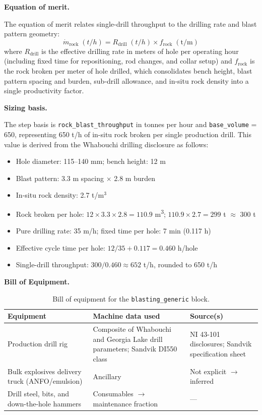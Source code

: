 \medskip
\noindent\textbf{Equation of merit.}\quad

The equation of merit relates single-drill throughput to the drilling rate and blast pattern geometry:
\[
	\dot{m}_{\text{rock}}\;(\si{t/h}) = R_{\text{drill}}\;(\si{t/h}) \times f_{\text{rock}}\;(\text{t/m})
\]
where $R_{\text{drill}}$ is the effective drilling rate in meters of hole per operating hour (including fixed time for repositioning, rod changes, and collar setup) and $f_{\text{rock}}$ is the rock broken per meter of hole drilled, which consolidates bench height, blast pattern spacing and burden, sub-drill allowance, and in-situ rock density into a single productivity factor.

\medskip
\noindent\textbf{Sizing basis.}\quad

The step basis is \texttt{rock\_blast\_throughput} in tonnes per hour and \texttt{base\_volume} = 650, representing 650 t/h of in-situ rock broken per single production drill. This value is derived from the Whabouchi drilling disclosure as follows:

\begin{itemize}[noitemsep]
	\item Hole diameter: 115--140 mm; bench height: 12 m
	\item Blast pattern: 3.3 m spacing $\times$ 2.8 m burden
	\item In-situ rock density: 2.7 t/m$^3$
	\item Rock broken per hole: $12 \times 3.3 \times 2.8 = 110.9$ \si{m^3}; $110.9 \times 2.7 = 299$ t $\approx$ 300 t
	\item Pure drilling rate: 35 m/h; fixed time per hole: 7 min (0.117 h)
	\item Effective cycle time per hole: $12/35 + 0.117 = 0.460$ h/hole
	\item Single-drill throughput: $300 / 0.460 \approx 652$ t/h, rounded to 650 t/h
\end{itemize}

\medskip
\noindent\textbf{Bill of Equipment.}\quad

\begin{table}[h!]
\caption{Bill of equipment for the \texttt{blasting\_generic} block.}
\centering
\begin{tabular}{>{\raggedright\arraybackslash}p{5.2cm}
                >{\raggedright\arraybackslash}p{4cm}
                >{\raggedright\arraybackslash}p{4.5cm}}
\toprule
\textbf{Equipment} & \textbf{Machine data used} & \textbf{Source(s)} \\
\midrule
Production drill rig & Composite of Whabouchi and Georgia Lake drill parameters; Sandvik DI550 class & NI 43-101 disclosures; Sandvik specification sheet \\
Bulk explosives delivery truck (ANFO/emulsion) & Ancillary & Not explicit $\rightarrow$ inferred \\
Drill steel, bits, and down-the-hole hammers & Consumables $\rightarrow$ maintenance fraction & --- \\
\bottomrule
\end{tabular}
\end{table}

